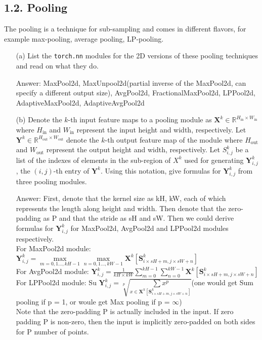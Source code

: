 \documentclass[12pt,letterpaper]{article}
\newcommand{\matr}[1]{\bm{#1}}     %
\begin{document}
\subsection*{1.2. Pooling}
The pooling is a technique for sub-sampling and comes in different flavors, for example max-pooling, average pooling, LP-pooling. 
\begin{itemize}
    \item[(a)] List the \texttt{torch.nn} modules for the 2D versions of these pooling techniques and read on what they do.
    
    Answer: MaxPool2d, MaxUnpool2d(partial inverse of the MaxPool2d, can specify a different output size), AvgPool2d, FractionalMaxPool2d, LPPool2d, AdaptiveMaxPool2d, AdaptiveAvgPool2d
    
    \item[(b)] Denote the $k$-th input feature maps to a pooling module as $\matr{X}^k \in \mathbb{R}^{H_{\textrm{in}}\times W_{\textrm{in}}} $ where $H_{\textrm{in}}$ and $W_{\text{in}}$ represent the input height and width, respectively. Let $\matr{Y}^k \in \mathbb{R}^{H_{\text{out}}\times W_{\textrm{out}}}$ denote the $k$-th output feature map of the module where $H_{\textrm{out}}$ and $W_{\textrm{out}}$ represent the output height and width, respectively. Let $S^{k}_{i,j}$ be a list of the indexes of elements in the sub-region of $X^k $ used for generating $\matr{Y}^k_{i,j}$, the $(i,j)$-th entry of $\matr{Y}^{k}$. 
    Using this notation, give formulas for $\matr{Y}^k_{i,j} $ from three pooling modules.
    
    Answer: First, denote that the kernel size as kH, kW, each of which represents the length along height and width. Then denote that the zero-padding as P and that the stride as sH and sW. Then we could derive formulas for $\matr{Y}^k_{i,j}$ for MaxPool2d, AvgPool2d and LPPool2d modules respectively.\\
    
    For MaxPool2d module: 
    $
    \matr{Y}^k_{i,j} = \underset{m=0,1\ldots,kH-1}{\max}
    \underset{n=0,1\ldots,kW-1}{\max}
    \matr{X}^k[\matr{S}^k_{i \times sH + m, j \times sW + n}]
    $\\
    For AvgPool2d module: 
    $
    \matr{Y}^k_{i,j} =
    \frac{1}{kH\times kW}\sum_{m=0}^{kH-1}\sum_{n=0}^{kW-1}
    \matr{X}^k[\matr{S}^k_{i \times sH + m, j \times sW + n}]
    $\\
    For LPPool2d module: Su
    $
    \matr{Y}^k_{i,j} = \sqrt[p]{\underset{x\in\matr{X}^k[\matr{S}^k_{i \times sH + m, j \times sW + n}]}{\sum x^p}}
    $\quad (one would get Sum pooling if p = 1, or woule get Max pooling if p = $\infty$)
    \\
    Note that the zero-padding P is actually included in the input. If zero padding P is non-zero, then the input is implicitly zero-padded on both sides for P number of points. 
    

\end{itemize}
\end{document}
